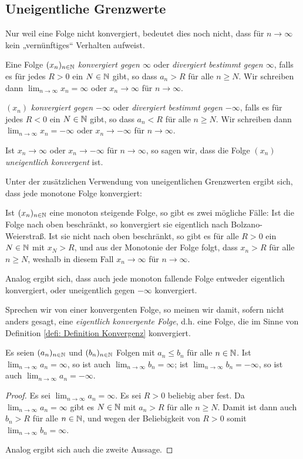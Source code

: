 \documentclass[a4paper,10pt]{article}
\begin{document}
\subsection{Uneigentliche Grenzwerte}
Nur weil eine Folge nicht konvergiert, bedeutet dies noch nicht, dass für $n \to \infty$ kein „vernünftiges“ Verhalten aufweist.


\begin{defi}
 Eine Folge $(x_n)_{n \in \mathbb{N}}$ \emph{konvergiert gegen $\infty$} oder \emph{divergiert bestimmt gegen $\infty$}, falls es für jedes $R > 0$ ein $N \in \mathbb{N}$ gibt, so dass $a_n > R$ für alle $n \geq N$. Wir schreiben dann $\lim_{n \to \infty} x_n = \infty$ oder $x_n \to \infty$ für $n \to \infty$.
 
 $(x_n)$ \emph{konvergiert gegen $-\infty$} oder \emph{divergiert bestimmt gegen $-\infty$}, falls es für jedes $R < 0$ ein $N \in \mathbb{N}$ gibt, so dass $a_n < R$ für alle $n \geq N$. Wir schreiben dann $\lim_{n \to \infty} x_n = -\infty$ oder $x_n \to -\infty$ für $n \to \infty$.
 
 Ist $x_n \to \infty$ oder $x_n \to -\infty$ für $n \to \infty$, so sagen wir, dass die Folge $(x_n)$ \emph{uneigentlich konvergent} ist.
\end{defi}


Unter der zusätzlichen Verwendung von uneigentlichen Grenzwerten ergibt sich, dass jede monotone Folge konvergiert:

Ist $(x_n)_{n \in \mathbb{N}}$ eine monoton steigende Folge, so gibt es zwei mögliche Fälle: Ist die Folge nach oben beschränkt, so konvergiert sie eigentlich nach Bolzano-Weierstraß. Ist sie nicht nach oben beschränkt, so gibt es für alle $R > 0$ ein $N \in \mathbb{N}$ mit $x_N > R$, und aus der Monotonie der Folge folgt, dass $x_n > R$ für alle $n \geq N$, weshalb in diesem Fall $x_n \to \infty$ für $n \to \infty$.

Analog ergibt sich, dass auch jede monoton fallende Folge entweder eigentlich konvergiert, oder uneigentlich gegen $-\infty$ konvergiert.


Sprechen wir von einer konvergenten Folge, so meinen wir damit, sofern nicht anders gesagt, eine \emph{eigentlich konvergente Folge}, d.h. eine Folge, die im Sinne von Definition \ref{defi: Definition Konvergenz} konvergiert.


\begin{lem}
 Es seien $(a_n)_{n \in \mathbb{N}}$ und $(b_n)_{n \in \mathbb{N}}$ Folgen mit $a_n \leq b_n$ für alle $n \in \mathbb{N}$. Ist $\lim_{n \to \infty} a_n = \infty$, so ist auch $\lim_{n \to \infty} b_n = \infty$; ist $\lim_{n \to \infty} b_n = -\infty$, so ist auch $\lim_{n \to \infty} a_n = -\infty$.
\end{lem}
\begin{proof}
 Es sei $\lim_{n \to \infty} a_n = \infty$. Es sei $R > 0$ beliebig aber fest. Da $\lim_{n \to \infty} a_n = \infty$ gibt es $N \in \mathbb{N}$ mit $a_n > R$ für alle $n \geq N$. Damit ist dann auch $b_n > R$ für alle $n \in \mathbb{N}$, und wegen der Beliebigkeit von $R > 0$ somit $\lim_{n \to \infty} b_n = \infty$.
 
 Analog ergibt sich auch die zweite Aussage.
\end{proof}
\end{document}
